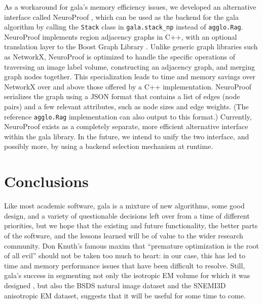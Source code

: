 \documentclass{frontiersSCNS} %
\begin{document}
As a workaround for gala's memory efficiency issues, we developed an alternative interface called NeuroProof \citep{np}, which can be used as the backend for the gala algorithm by calling the \texttt{\small Stack} class in \texttt{\small gala.stack\_np} instead of \texttt{\small agglo.Rag}.
NeuroProof implements region adjacency graphs in C++, with an optional translation layer to the Boost Graph Library \citep{bgl}.
Unlike generic graph libraries such as NetworkX, NeuroProof is optimized to handle the specific operations of traversing an image label volume, constructing an adjacency graph, and merging graph nodes together.
This specialization leads to time and memory savings over NetworkX over and above those offered by a C++ implementation.
NeuroProof serializes the graph using a JSON format that contains a list of edges (node pairs) and a few relevant attributes, such as node sizes and edge weights.
(The reference \texttt{\small agglo.Rag} implementation can also output to this format.)
Currently, NeuroProof exists as a completely separate, more efficient alternative interface within the gala library.
In the future, we intend to unify the two interface, and possibly more, by using a backend selection mechanism at runtime.

\section{Conclusions}

Like most academic software, gala is a mixture of new algorithms, some good design, and a variety of questionable decisions left over from a time of different priorities, but we hope that the existing and future functionality, the better parts of the software, and the lessons learned will be of value to the wider research community.
Don Knuth's famous maxim that ``premature optimization is the root of all evil'' \citep{knuth74opt} should not be taken too much to heart: in our case, this has led to time and memory performance issues that have been difficult to resolve.
Still, gala's success in segmenting not only the isotropic EM volume for which it was designed \citep{Glasner:2011uk, NunezIglesias:2013cd}, but also the BSDS natural image dataset and the SNEMI3D anisotropic EM dataset, suggests that it will be useful for some time to come.



%




\end{document}
